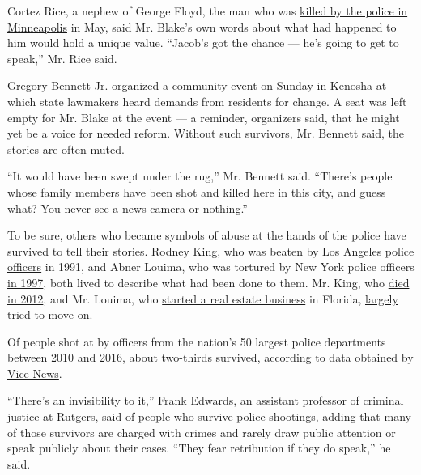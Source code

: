 Cortez Rice, a nephew of George Floyd, the man who was
\href{https://www.nytimes3xbfgragh.onion/2020/05/31/us/george-floyd-investigation.html}{killed
by the police in Minneapolis} in May, said Mr. Blake's own words about
what had happened to him would hold a unique value. ``Jacob's got the
chance --- he's going to get to speak,'' Mr. Rice said.

Gregory Bennett Jr. organized a community event on Sunday in Kenosha at
which state lawmakers heard demands from residents for change. A seat
was left empty for Mr. Blake at the event --- a reminder, organizers
said, that he might yet be a voice for needed reform. Without such
survivors, Mr. Bennett said, the stories are often muted.

``It would have been swept under the rug,'' Mr. Bennett said. ``There's
people whose family members have been shot and killed here in this city,
and guess what? You never see a news camera or nothing.''

To be sure, others who became symbols of abuse at the hands of the
police have survived to tell their stories. Rodney King, who
\href{https://www.nytimes3xbfgragh.onion/2020/06/03/us/rodney-king-george-floyd-los-angeles.html}{was
beaten by Los Angeles police officers} in 1991, and Abner Louima, who
was tortured by New York police officers
\href{https://www.nytimes3xbfgragh.onion/1999/05/26/nyregion/louima-case-overview-officer-seeking-some-mercy-admits-louima-s-torture.html}{in
1997}, both lived to describe what had been done to them. Mr. King, who
\href{https://www.nytimes3xbfgragh.onion/2012/06/18/us/rodney-king-whose-beating-led-to-la-riots-dead-at-47.html}{died
in 2012}, and Mr. Louima, who
\href{https://www.nytimes3xbfgragh.onion/2002/06/23/magazine/no-way-out.html}{started
a real estate business} in Florida,
\href{https://www.nytimes3xbfgragh.onion/2004/09/19/us/12-years-after-the-riots-rodney-king-gets-along.html}{largely
tried to move on}.

Of people shot at by officers from the nation's 50 largest police
departments between 2010 and 2016, about two-thirds survived, according
to \href{https://news.vice.com/en_us/article/xwvv3a/shot-by-cops}{data
obtained by Vice News}.

``There's an invisibility to it,'' Frank Edwards, an assistant professor
of criminal justice at Rutgers, said of people who survive police
shootings, adding that many of those survivors are charged with crimes
and rarely draw public attention or speak publicly about their cases.
``They fear retribution if they do speak,'' he said.

